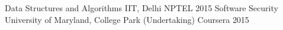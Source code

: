 \begin{cvhonors}
  \cvhonor
    {Data Structures and Algorithms}
    {IIT, Delhi}
    {NPTEL}
    {2015}
  \cvhonor
    {Software Security}
    {University of Maryland, College Park (Undertaking)}
    {Coursera}
    {2015}
\end{cvhonors}
